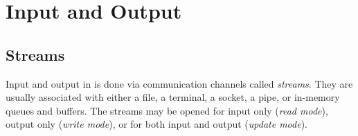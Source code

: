 %
% 
% 
% 
% 
%
%

\chapter{Input and Output}
\label{chapio}
\section{Streams}
Input and output in {\eclipse} is done via communication channels
called {\it streams}.
They are usually associated with either a file, a terminal, a socket,
a pipe, or in-memory queues and buffers.
The streams may be opened for input only ({\it read mode}), output only
({\it write mode}), or for both input and output ({\it update mode}).

